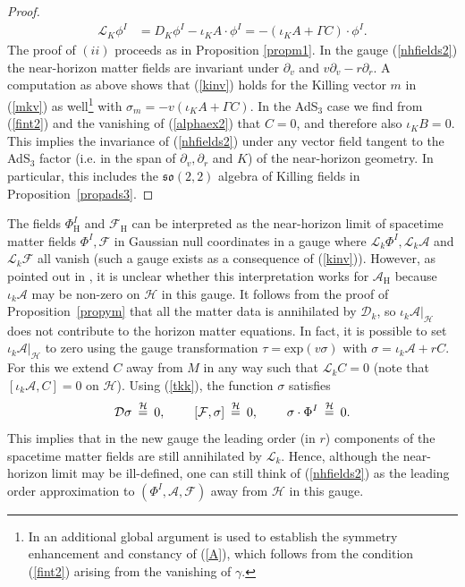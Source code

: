 \documentclass[11pt, reqno]{amsart}
\theoremstyle{plain}
\theoremstyle{definition}
\numberwithin{equation}{section}
\begin{document}
\begin{proof}
\begin{align*}
    \mathcal{L}_K\phi^I &= D_K\phi^I - \iota_KA\cdot\phi^I = -(\iota_KA + \Gamma C)\cdot\phi^I.
\end{align*}
The proof of $(ii)$ proceeds as in Proposition \ref{propm1}. In the gauge (\ref{nhfields2}) the near-horizon matter fields are invariant under $\partial_v$ and $v\partial_v - r\partial_r$. A computation as above shows that (\ref{kinv}) holds for the Killing vector $m$ in (\ref{mkv}) as well\footnote{In \cite{LL13} an additional global argument is used to establish the symmetry enhancement and constancy of (\ref{A}), which follows from the condition (\ref{fint2}) arising from the vanishing of $\gamma$.} with $\sigma_m = -v(\iota_K A + \Gamma C)$.  In the AdS$_3$ case we find from (\ref{fint2}) and the vanishing of (\ref{alphaex2}) that $C = 0$, and therefore also $\iota_K B = 0$. This implies the invariance of (\ref{nhfields2}) under any vector field tangent to the AdS$_3$ factor (i.e. in the span of $\partial_v,\partial_r$ and $K$) of the near-horizon geometry. In particular, this includes the $\mathfrak{so}(2,2)$ algebra of Killing fields in Proposition~\ref{propads3}.
\end{proof}
The fields $\Phi_\text{H}^I$ and $\mathcal{F}_{\text{H}}$ can be interpreted as the near-horizon limit of spacetime matter fields $\Phi^I,\mathcal{F}$ in Gaussian null coordinates in a gauge where $\mathcal{L}_k\Phi^I, \mathcal{L}_k\mathcal{A}$ and $\mathcal{L}_k \mathcal{F}$ all vanish (such a gauge exists as a consequence of (\ref{kinv})). However, as pointed out in \cite{LL13}, it is unclear whether this interpretation works for $\mathcal{A}_\text{H}$ because $\iota_k\mathcal{A}$ may be non-zero on $\mathcal{H}$ in this gauge. It follows from the proof of Proposition~\ref{propym} that all the matter data is annihilated by $\mathcal{D}_k$, so $\iota_k\mathcal{A}\vert_{\mathcal{H}}$ does not contribute to the horizon matter equations. In fact, it is possible to set $\iota_k\mathcal{A}\vert_{\mathcal{H}}$ to zero using the gauge transformation $\tau = \text{exp}(v\sigma)$ with $\sigma = \iota_k\mathcal{A} + rC$. For this we extend $C$ away from $M$ in any way such that $\mathcal{L}_kC = 0$ (note that $[\iota_k\mathcal{A},C] = 0$ on $\mathcal{H}$). Using (\ref{tkk}), the function $\sigma$ satisfies
\begin{equation*}
\mathcal{D}\sigma\:\overset{\mathcal{H}}{=}\:0, \hspace{.8cm} [\mathcal{F},\sigma] \:\overset{\mathcal{H}}{=}\:0,\hspace{.8cm}\sigma\cdot \Phi^I \:\overset{\mathcal{H}}{=}\: 0.
\end{equation*}
This implies that in the new gauge the leading order (in $r$) components of the spacetime matter fields are still annihilated by $\mathcal{L}_k$. Hence, although the near-horizon limit may be ill-defined, one can still think of (\ref{nhfields2}) as the leading order approximation to $(\Phi^I,\mathcal{A},\mathcal{F})$ away from $\mathcal{H}$ in this gauge.
\end{document}
